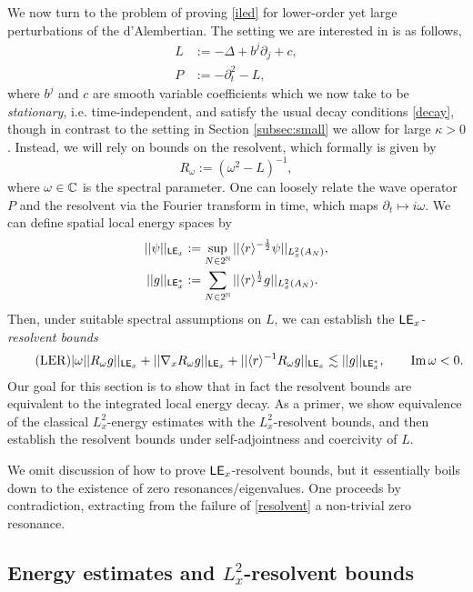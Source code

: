 
We now turn to the problem of proving \eqref{iled} for lower-order yet large perturbations of the d'Alembertian. The setting we are interested in is as follows, 
\begin{align*}
		L
			&:= - \Delta + b^j \partial_j + c, \\
		P
			&:= - \partial_t^2 - L,
	\end{align*}
where $b^j$ and $c$ are smooth variable coefficients which we now take to be \textit{stationary}, i.e. time-independent, and satisfy the usual decay conditions \eqref{decay},
though in contrast to the setting in Section \ref{subsec:small} we allow for large $\kappa > 0$. Instead, we will rely on bounds on the resolvent, which formally is given by
	\[
		R_\omega := (\omega^2 - L)^{-1},
	\]
where $\omega \in \mathbb C$ is the spectral parameter. One can loosely relate the wave operator $P$ and the resolvent via the Fourier transform in time, which maps $\partial_t \mapsto i \omega$. We can define spatial local energy spaces by
	\begin{align*}
		||\psi||_{\mathsf{LE}_{x}}
			&:= \sup_{N \in 2^\mathbb N} ||\langle r \rangle^{-\frac12} \psi||_{L^2_{x} (A_N)},\\
		||g||_{\mathsf{LE}^*_{x}}
			&:= \sum_{N \in 2^\mathbb N} || \langle r \rangle^{\frac12} g||_{L^2_{x} (A_N)}.	
	\end{align*}
Then, under suitable spectral assumptions on $L$, we can establish the \textit{$\mathsf{LE}_x$-resolvent bounds}
	\begin{equation}\tag{$\mathrm{LER}$}\label{eq:resolvent}
		|\omega| |R_\omega g||_{\LE_x} + ||\nabla_x R_\omega g||_{\LE_x} + ||\langle r \rangle^{-1} R_\omega g||_{\LE_x} \lesssim ||g||_{\LE^*_x}, \qquad \Im \omega < 0.
	\end{equation}
Our goal for this section is to show that in fact the resolvent bounds are equivalent to the integrated local energy decay. As a primer, we show equivalence of the classical $L^2_x$-energy estimates with the $L^2_x$-resolvent bounds, and then establish the resolvent bounds under self-adjointness and coercivity of $L$. 

\begin{remark}
	We omit discussion of how to prove $\mathsf{LE}_x$-resolvent bounds, but it essentially boils down to the existence of zero resonances/eigenvalues. One proceeds by contradiction, extracting from the failure of \eqref{resolvent} a non-trivial zero resonance. 
\end{remark}
	

\subsection{Energy estimates and $L^2_x$-resolvent bounds}

